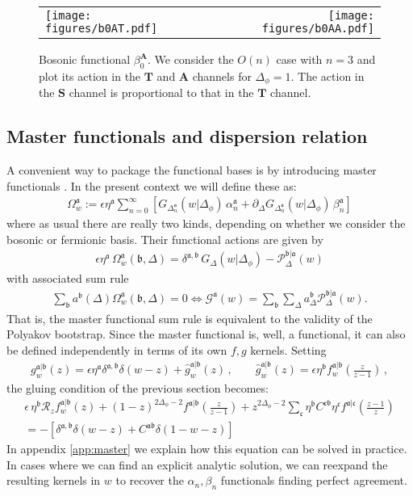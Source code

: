 \documentclass[12pt]{article}
\numberwithin{equation}{section}
\newcommand{\bea}{\begin{eqnarray}}
\newcommand{\eea}{\end{eqnarray}}
\newcommand{\mbf}{\mathbf}
\newcommand{\Df}{{\Delta_\phi}}
\newcommand{\mf}[1]{\mathfrak #1}
\begin{document}
		\begin{figure}[t]
		\begin{center}
			\begin{tabular}{lr}
			\texttt{[image: figures/b0AT.pdf]}
			&
			\texttt{[image: figures/b0AA.pdf]}
			\end{tabular}
			\caption{\label{fig:b0} Bosonic functional $\beta^{\mbf A}_0$. We consider the $O(n)$ case with $n=3$ and plot its action in the $\mbf T$ and $\mbf A$ channels for $\Df=1$. The action in the $\mbf S$ channel is proportional to that in the $\mbf T$ channel.}
		\end{center}
	\end{figure}
	
	
	
	\subsection{Master functionals and dispersion relation}
	
	A convenient way to package the functional bases is by introducing master functionals \cite{Paulos:2020zxx}. In the present context we will define these as:
	\bea
	\Omega^{\mf a}_w:=\epsilon \eta^{\mf a} \sum_{n=0}^\infty \left[ G_{\Delta_n^{\mf a}}(w|\Df)\,\alpha_n^{\mf a}+\partial_{\Delta} G_{\Delta_n^{\mf a}}(w|\Df)\, \beta_n^{\mf a}\right]
	\eea
	where as usual there are really two kinds, depending on whether we consider the bosonic or fermionic basis. Their functional actions are given by
	\bea
	\epsilon \eta^{\mf a}\,\Omega^{\mf a}_w(\mf b,\Delta)=\delta^{\mf a,\mf b}\,G_{\Delta}(w|\Df)-\mathcal P_{\Delta}^{\mf b|\mf a}(w)
	\eea
	with associated sum rule
	\bea
	\sum_{\mf b} a^{\mf b}(\Delta) \Omega^{\mf a}_w(\mf b,\Delta)=0 \Leftrightarrow \mathcal G^{\mf a}(w)=\sum_{\mf b} \sum_{\Delta} a^{\mf b}_{\Delta} \mathcal P^{\mf b|\mf a}_\Delta(w).
	\eea
	That is, the master functional sum rule is equivalent to the validity of the Polyakov bootstrap. Since the master functional is, well, a functional, it can also be defined independently in terms of its own $f, g$ kernels. Setting
	\bea
	g_w^{\mf a|\mf b}(z)=\epsilon \eta^{\mf a}\delta^{\mf a,\mf b} \delta(w-z)+ \hat g_w^{\mf a|\mf b}(z)\,,\qquad \hat g_w^{\mf a|\mf b}(z)=\epsilon \eta^{\mf b} f_w^{\mf a|\mf b}(\mbox{$\frac{z}{z-1}$})\,,
	\eea
	the gluing condition of the previous section becomes:
	\begin{multline}
	\label{eq:mastereq}
	\epsilon\, \eta^{\mf b} \mathcal R_z f_w^{\mf a|\mf b}(z)+(1-z)^{2\Df-2} f^{\mf a|\mf b}(\mbox{$\frac{z}{z-1}$})+z^{2\Df -2}\sum_{\mf c} \eta^{\mf b} C^{\mf c \mf b} \eta^{\mf c} f^{\mf a|\mf c}(\mbox{$\frac{z-1}{z}$})\\=-\left[\delta^{\mf a,\mf b}\delta(w-z)+C^{\mf a \mf b} \delta(1-w-z)\right]
	\end{multline}
	In appendix \ref{app:master} we explain how this equation can be solved in practice. In cases where we can find an explicit analytic solution, we can reexpand the resulting kernels in $w$ to recover the $\alpha_n, \beta_n$ functionals finding perfect agreement.
	
\end{document}
